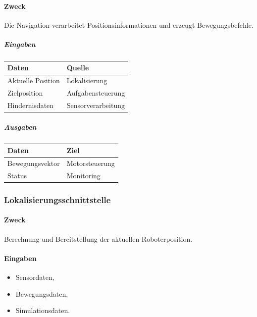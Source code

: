 \documentclass[
  a4paper,
  12pt,
  DIV=12,        %
  parskip=half,  %
  headings=small %
]{scrartcl}
\theoremstyle{definition}
\providecommand{\tightlist}{%
  \setlength{\itemsep}{0pt}\setlength{\parskip}{0pt}}
\theoremstyle{definition}
\begin{document}
\paragraph{Zweck}\label{zweck-7}

Die Navigation verarbeitet Positionsinformationen und erzeugt
Bewegungsbefehle.

\subparagraph{Eingaben}\label{eingaben-1}

\begin{longtable}[]{@{}ll@{}}
\toprule\noalign{}
Daten & Quelle \\
\midrule\noalign{}
\endhead
\bottomrule\noalign{}
\endlastfoot
Aktuelle Position & Lokalisierung \\
Zielposition & Aufgabensteuerung \\
Hindernisdaten & Sensorverarbeitung \\
\end{longtable}

\subparagraph{Ausgaben}\label{ausgaben-1}

\begin{longtable}[]{@{}ll@{}}
\toprule\noalign{}
Daten & Ziel \\
\midrule\noalign{}
\endhead
\bottomrule\noalign{}
\endlastfoot
Bewegungsvektor & Motorsteuerung \\
Status & Monitoring \\
\end{longtable}

\subsubsection{Lokalisierungsschnittstelle}\label{lokalisierungsschnittstelle}

\paragraph{Zweck}\label{zweck-8}

Berechnung und Bereitstellung der aktuellen Roboterposition.

\paragraph{Eingaben}\label{eingaben-2}

\begin{itemize}
\tightlist
\item
  Sensordaten,
\item
  Bewegungsdaten,
\item
  Simulationsdaten.
\end{itemize}
\end{document}
